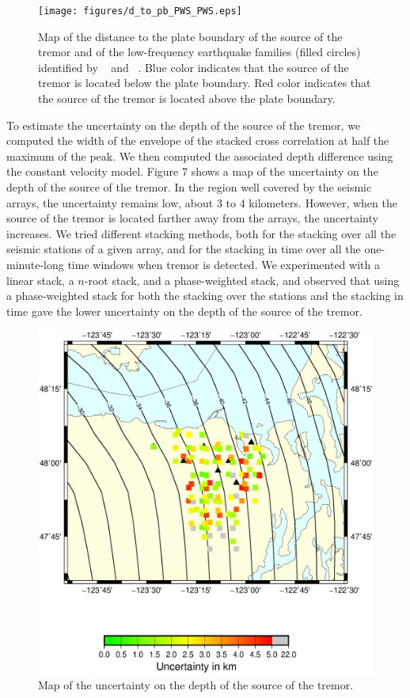 \documentclass[draft]{agujournal2019}
\begin{document}
\begin{figure}
\noindent\texttt{[image: figures/d\_to\_pb\_PWS\_PWS.eps]}
\caption{Map of the distance to the plate boundary of the source of the tremor and of the low-frequency earthquake families (filled circles) identified by ~ and ~. Blue color indicates that the source of the tremor is located below the plate boundary. Red color indicates that the source of the tremor is located above the plate boundary.}
\label{pngfiguresample}
\end{figure}

To estimate the uncertainty on the depth of the source of the tremor, we computed the width of the envelope of the stacked cross correlation at half the maximum of the peak. We then computed the associated depth difference using the constant velocity model. Figure 7 shows a map of the uncertainty on the depth of the source of the tremor. In the region well covered by the seismic arrays, the uncertainty remains low, about 3 to 4 kilometers. However, when the source of the tremor is located farther away from the arrays, the uncertainty increases. We tried different stacking methods, both for the stacking over all the seismic stations of a given array, and for the stacking in time over all the one-minute-long time windows when tremor is detected. We experimented with a linear stack, a $n$-root stack, and a phase-weighted stack, and observed that using a phase-weighted stack for both the stacking over the stations and the stacking in time gave the lower uncertainty on the depth of the source of the tremor.

\begin{figure}
\noindent\includegraphics[width=\textwidth, trim={1cm 5cm 2cm 6cm},clip]{figures/uncertainty_PWS_PWS.eps}
\caption{Map of the uncertainty on the depth of the source of the tremor.}
\label{pngfiguresample}
\end{figure}
\end{document}
